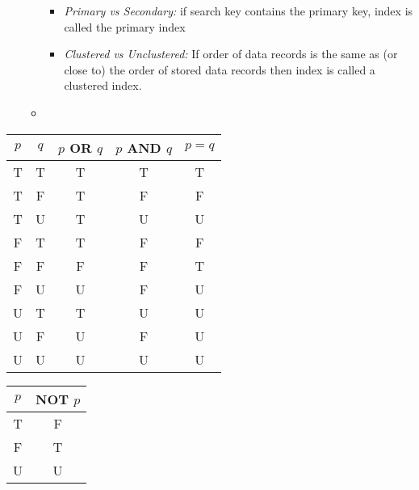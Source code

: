 \documentclass[landscape,8pt]{extarticle}
\begin{document}
\begin{multicols}{4}
\begin{itemize}
\begin{itemize}
                        \begin{itemize}
                            \item \emph{Primary vs Secondary:} if search key contains the primary key, index is called the primary index
                            \item \emph{Clustered vs Unclustered:} If order of data records is the same as (or close to) the order of stored data records then index is called a clustered index.
                        \end{itemize}
                        \item
              \end{itemize}
    \end{itemize}
    \begin{center}
        \begin{tabular}{ | c | c | c | c | c | } \hline
            $p$ & $q$ & $p$ OR $q$ & $p$ AND $q$ & $p = q$ \\ \hline
            T   & T   & T          & T           & T       \\ \hline
            T   & F   & T          & F           & F       \\ \hline
            T   & U   & T          & U           & U       \\ \hline
            F   & T   & T          & F           & F       \\ \hline
            F   & F   & F          & F           & T       \\ \hline
            F   & U   & U          & F           & U       \\ \hline
            U   & T   & T          & U           & U       \\ \hline
            U   & F   & U          & F           & U       \\ \hline
            U   & U   & U          & U           & U       \\ \hline
        \end{tabular}
    \end{center}
    \begin{center}
        \begin{tabular}{| c | c |} \hline
            $p$ & NOT $p$ \\ \hline
            T   & F       \\ \hline
            F   & T       \\ \hline
            U   & U       \\ \hline
        \end{tabular}

\end{center}
\end{multicols}
\end{document}
